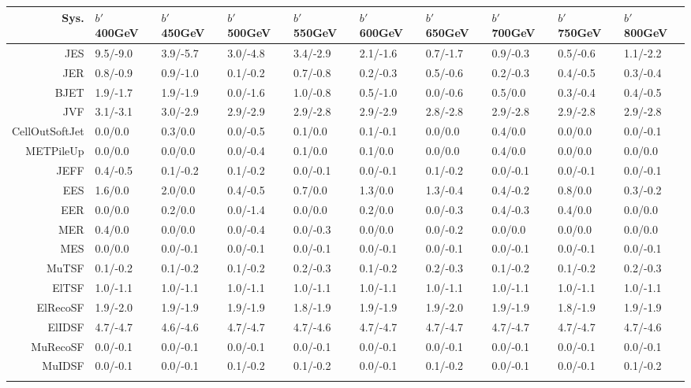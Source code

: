 \begin{tabular}{r|p{.08\linewidth}p{.08\linewidth}p{.08\linewidth}p{.08\linewidth}p{.08\linewidth}p{.08\linewidth}p{.08\linewidth}p{.08\linewidth}p{.08\linewidth}}
\toprule
 Sys.  & $b'$ 400GeV & $b'$ 450GeV & $b'$ 500GeV & $b'$ 550GeV & $b'$ 600GeV & $b'$ 650GeV & $b'$ 700GeV & $b'$ 750GeV & $b'$ 800GeV \\
\toprule
JES  & 9.5/-9.0 & 3.9/-5.7 & 3.0/-4.8 & 3.4/-2.9 & 2.1/-1.6 & 0.7/-1.7 & 0.9/-0.3 & 0.5/-0.6 & 1.1/-2.2 \\
JER  & 0.8/-0.9 & 0.9/-1.0 & 0.1/-0.2 & 0.7/-0.8 & 0.2/-0.3 & 0.5/-0.6 & 0.2/-0.3 & 0.4/-0.5 & 0.3/-0.4 \\
BJET  & 1.9/-1.7 & 1.9/-1.9 & 0.0/-1.6 & 1.0/-0.8 & 0.5/-1.0 & 0.0/-0.6 & 0.5/0.0 & 0.3/-0.4 & 0.4/-0.5 \\
JVF  & 3.1/-3.1 & 3.0/-2.9 & 2.9/-2.9 & 2.9/-2.8 & 2.9/-2.9 & 2.8/-2.8 & 2.9/-2.8 & 2.9/-2.8 & 2.9/-2.8 \\
CellOutSoftJet  & 0.0/0.0 & 0.3/0.0 & 0.0/-0.5 & 0.1/0.0 & 0.1/-0.1 & 0.0/0.0 & 0.4/0.0 & 0.0/0.0 & 0.0/-0.1 \\
METPileUp  & 0.0/0.0 & 0.0/0.0 & 0.0/-0.4 & 0.1/0.0 & 0.1/0.0 & 0.0/0.0 & 0.4/0.0 & 0.0/0.0 & 0.0/0.0 \\
JEFF  & 0.4/-0.5 & 0.1/-0.2 & 0.1/-0.2 & 0.0/-0.1 & 0.0/-0.1 & 0.1/-0.2 & 0.0/-0.1 & 0.0/-0.1 & 0.0/-0.1 \\
EES  & 1.6/0.0 & 2.0/0.0 & 0.4/-0.5 & 0.7/0.0 & 1.3/0.0 & 1.3/-0.4 & 0.4/-0.2 & 0.8/0.0 & 0.3/-0.2 \\
EER  & 0.0/0.0 & 0.2/0.0 & 0.0/-1.4 & 0.0/0.0 & 0.2/0.0 & 0.0/-0.3 & 0.4/-0.3 & 0.4/0.0 & 0.0/0.0 \\
MER  & 0.4/0.0 & 0.0/0.0 & 0.0/-0.4 & 0.0/-0.3 & 0.0/0.0 & 0.0/-0.2 & 0.0/0.0 & 0.0/0.0 & 0.0/0.0 \\
MES  & 0.0/0.0 & 0.0/-0.1 & 0.0/-0.1 & 0.0/-0.1 & 0.0/-0.1 & 0.0/-0.1 & 0.0/-0.1 & 0.0/-0.1 & 0.0/-0.1 \\
MuTSF  & 0.1/-0.2 & 0.1/-0.2 & 0.1/-0.2 & 0.2/-0.3 & 0.1/-0.2 & 0.2/-0.3 & 0.1/-0.2 & 0.1/-0.2 & 0.2/-0.3 \\
ElTSF  & 1.0/-1.1 & 1.0/-1.1 & 1.0/-1.1 & 1.0/-1.1 & 1.0/-1.1 & 1.0/-1.1 & 1.0/-1.1 & 1.0/-1.1 & 1.0/-1.1 \\
ElRecoSF  & 1.9/-2.0 & 1.9/-1.9 & 1.9/-1.9 & 1.8/-1.9 & 1.9/-1.9 & 1.9/-2.0 & 1.9/-1.9 & 1.8/-1.9 & 1.9/-1.9 \\
ElIDSF  & 4.7/-4.7 & 4.6/-4.6 & 4.7/-4.7 & 4.7/-4.6 & 4.7/-4.7 & 4.7/-4.7 & 4.7/-4.7 & 4.7/-4.7 & 4.7/-4.6 \\
MuRecoSF  & 0.0/-0.1 & 0.0/-0.1 & 0.0/-0.1 & 0.0/-0.1 & 0.0/-0.1 & 0.0/-0.1 & 0.0/-0.1 & 0.0/-0.1 & 0.0/-0.1 \\
MuIDSF  & 0.0/-0.1 & 0.0/-0.1 & 0.1/-0.2 & 0.1/-0.2 & 0.0/-0.1 & 0.1/-0.2 & 0.0/-0.1 & 0.0/-0.1 & 0.1/-0.2 \\
 \\
\bottomrule
\end{tabular}
